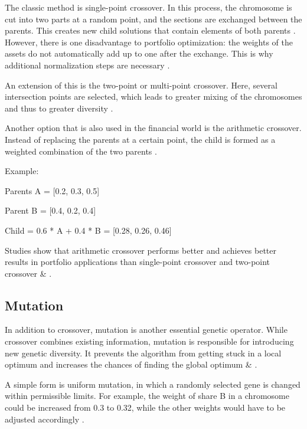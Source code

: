 \documentclass{agasthesis}
\begin{document}
The classic method is single-point crossover. In this process, the chromosome is cut into two parts at a random point, and the sections are exchanged between 
the parents. This creates new child solutions that contain elements of both parents \cite[p. 8-9]{melanie_introduction_1999}. However, there is one disadvantage to portfolio 
optimization: the weights of the assets do not automatically add up to one after the exchange. This is why additional normalization steps are necessary \cite[p. 1750]{fu_adopting_2013}.

An extension of this is the two-point or multi-point crossover. Here, several intersection points are selected, which leads to greater mixing of the chromosomes 
and thus to greater diversity \cite[p. 57]{melanie_introduction_1999}. 

Another option that is also used in the financial world is the arithmetic crossover. Instead of replacing the parents at a certain point, 
the child is formed as a weighted combination of the two parents \cite[p. 10]{filograsso_adaptive_2023}.

Example:

Parents A = [0.2, 0.3, 0.5]

Parent B = [0.4, 0.2, 0.4]

Child = 0.6 * A + 0.4 * B = [0.28, 0.26, 0.46]

Studies show that arithmetic crossover performs better and achieves better results in portfolio applications 
than single-point crossover and two-point crossover \cite[p. 71]{dubinskas_investment_2017} & \cite[p. 152]{sefiane_portfolio_2012}.

\subsection{Mutation}
In addition to crossover, mutation is another essential genetic operator. While crossover combines existing information, 
mutation is responsible for introducing new genetic diversity. It prevents the algorithm from getting stuck in a local optimum 
and increases the chances of finding the global optimum \cite[p. 129-130]{melanie_introduction_1999} & \cite[p. 471]{kalayci_review_2017}.

A simple form is uniform mutation, in which a randomly selected gene is changed within permissible limits. For example, 
the weight of share B in a chromosome could be increased from 0.3 to 0.32, while the other weights would have to be adjusted 
accordingly \cite[p. 18]{brzek_exploration-driven_2025}.
\end{document}
